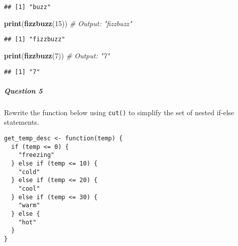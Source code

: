 \documentclass[
]{article}
\newenvironment{Shaded}{\begin{snugshade}}{\end{snugshade}}
\newcommand{\CommentTok}[1]{\textcolor[rgb]{0.56,0.35,0.01}{\textit{#1}}}
\newcommand{\DecValTok}[1]{\textcolor[rgb]{0.00,0.00,0.81}{#1}}
\newcommand{\FunctionTok}[1]{\textcolor[rgb]{0.13,0.29,0.53}{\textbf{#1}}}
\newcommand{\NormalTok}[1]{#1}
\begin{document}
\begin{verbatim}
## [1] "buzz"
\end{verbatim}

\begin{Shaded}
\begin{Highlighting}[]
\FunctionTok{print}\NormalTok{(}\FunctionTok{fizzbuzz}\NormalTok{(}\DecValTok{15}\NormalTok{))   }\CommentTok{\# Output: "fizzbuzz"}
\end{Highlighting}
\end{Shaded}

\begin{verbatim}
## [1] "fizzbuzz"
\end{verbatim}

\begin{Shaded}
\begin{Highlighting}[]
\FunctionTok{print}\NormalTok{(}\FunctionTok{fizzbuzz}\NormalTok{(}\DecValTok{7}\NormalTok{))    }\CommentTok{\# Output: "7"}
\end{Highlighting}
\end{Shaded}

\begin{verbatim}
## [1] "7"
\end{verbatim}

\hypertarget{question-5}{%
\subparagraph{Question 5}\label{question-5}}

Rewrite the function below using \texttt{cut()} to simplify the set of
nested if-else statements.

\begin{verbatim}
get_temp_desc <- function(temp) {
  if (temp <= 0) {
    "freezing"
  } else if (temp <= 10) {
    "cold"
  } else if (temp <= 20) {
    "cool"
  } else if (temp <= 30) {
    "warm"
  } else {
    "hot"
  } 
}
\end{verbatim}
\end{document}
